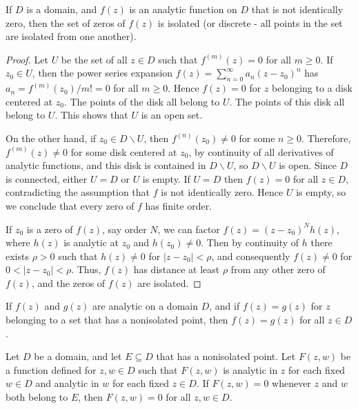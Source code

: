 \documentclass[12pt, a4paper, oneside, openright, titlepage]{book}
\begin{document}
\begin{thm}
    If $D$ is a domain, and $f(z)$ is an analytic function on $D$ that is not identically zero, then the set of zeros of $f(z)$ is isolated (or discrete - all points in the set are isolated from one another).
\end{thm}
\begin{proof}
    Let $U$ be the set of all $z \in D$ such that $f^{(m)}(z) = 0$ for all $m \geq 0$. If $z_0 \in U$, then the power series expansion $f(z) = \sum_{n=0}^{\infty}a_n(z-z_0)^n$ has $a_n = f^{(m)}(z_0)/m! = 0$ for all $m \geq 0$. Hence $f(z) = 0$ for $z$ belonging to a disk centered at $z_0$. The points of the disk all belong to $U$. The points of this disk all belong to $U$. This shows that $U$ is an open set.

    On the other hand, if $z_0 \in D\backslash U$, then $f^{(n)}(z_0) \neq 0$ for some $n \geq 0$. Therefore, $f^{(m)}(z) \neq 0$ for some disk centered at $z_0$, by continuity of all derivatives of analytic functions, and this disk is contained in $D\backslash U$, so $D\backslash U$ is open. Since $D$ is connected, either $U = D$ or $U$ is empty. If $U = D$ then $f(z) = 0$ for all $z \in D$, contradicting the assumption that $f$ is not identically zero. Hence $U$ is empty, so we conclude that every zero of $f$ has finite order.

    If $z_0$ is a zero of $f(z)$, say order $N$, we can factor $f(z) = (z-z_0)^Nh(z)$, where $h(z)$ is analytic at $z_0$ and $h(z_0) \neq 0$. Then by continuity of $h$ there exists $\rho > 0$ such that $h(z) \neq 0$ for $|z-z_0| < \rho$, and consequently $f(z) \neq 0$ for $0 < |z-z_0| < \rho$. Thus, $f(z)$ has distance at least $\rho$ from any other zero of $f(z)$, and the zeros of $f(z)$ are isolated.
\end{proof}



\begin{namthm}
    If $f(z)$ and $g(z)$ are analytic on a domain $D$, and if $f(z) = g(z)$ for $z$ belonging to a set that has a nonisolated point, then $f(z) = g(z)$ for all $z \in D$.
\end{namthm}


\begin{thm}
    Let $D$ be a domain, and let $E \subseteq D$ that has a nonisolated point. Let $F(z,w)$ be a function defined for $z,w \in D$ such that $F(z,w)$ is analytic in $z$ for each fixed $w \in D$ and analytic in $w$ for each fixed $z \in D$. If $F(z,w) = 0$ whenever $z$ and $w$ both belong to $E$, then $F(z,w) = 0$ for all $z,w \in D$.
\end{thm}
\end{document}

